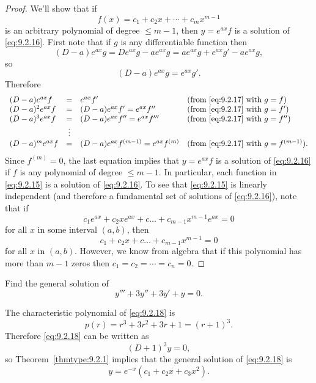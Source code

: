 \documentclass{ximera}
\begin{document}
\begin{proof}
We'll show that if
$$
f(x)=c_1+c_2x+\cdots+c_mx^{m-1}
$$
is an arbitrary polynomial of degree $\le m-1$, then $y=e^{ax}f$
is a solution of \eqref{eq:9.2.16}. First note that if $g$ is any
differentiable function then
$$
(D-a)e^{ax}g=De^{ax}g-ae^{ax}g=ae^{ax}g+e^{ax}g'-ae^{ax}g,
$$
so
\begin{equation} \label{eq:9.2.17}
(D-a)e^{ax}g=e^{ax}g'.
\end{equation}
Therefore
$$
\begin{array}{lcll}
(D-a)e^{ax}f&=&e^{ax}f'&\mbox{(from \eqref{eq:9.2.17} with
$g=f$)}\\
(D-a)^2e^{ax}f&=&
(D-a)e^{ax}f'=e^{ax}f''
&\mbox{(from \eqref{eq:9.2.17} with $g=f'$)}\\
(D-a)^3e^{ax}f&=&
(D-a)e^{ax}f''=e^{ax}f'''
&\mbox{(from \eqref{eq:9.2.17} with $g=f''$)}\\
&\vdots&\\
(D-a)^me^{ax}f
&=&(D-a)e^{ax}f^{(m-1)}=e^{ax}f^{(m)}
&\mbox{(from \eqref{eq:9.2.17} with $g=f^{(m-1)}$)}.
\end{array}
$$
Since $f^{(m)}=0$, the last equation implies that $y=e^{ax}f$ is a
solution of \eqref{eq:9.2.16} if $f$ is any polynomial of degree $\leq
m-1$. In particular, each function in \eqref{eq:9.2.15} is a solution of
\eqref{eq:9.2.16}. To see that \eqref{eq:9.2.15} is linearly independent (and
therefore a fundamental set of solutions of \eqref{eq:9.2.16}), note that
if
$$
c_1e^{ax}+c_2xe^{ax}+c\dots+c_{m-1}x^{m-1}e^{ax}=0
$$
for all $x$ in some interval $(a,b)$, then
$$
c_1+c_2x+c\dots+c_{m-1}x^{m-1}=0
$$
for all $x$ in $(a,b)$.  However, we know from algebra that if this
polynomial has more than $m-1$ zeros then $c_1=c_2=\cdots=c_n=0$.
\end{proof}

\begin{example}\label{example:9.2.5}
Find the general solution of
\begin{equation} \label{eq:9.2.18}
y'''+3y''+3y'+y=0.
\end{equation}


\begin{explanation} The characteristic polynomial of \eqref{eq:9.2.18} is
$$
p(r)=r^3+3r^2+3r+1=(r+1)^3.
$$
Therefore \eqref{eq:9.2.18} can be written as
$$
(D+1)^3y=0,
$$
so Theorem~\ref{thmtype:9.2.1} implies that the general solution of
\eqref{eq:9.2.18} is
$$
y=e^{-x}(c_1+c_2x+c_3x^2).
$$
\end{explanation}
\end{example}
\end{document}
